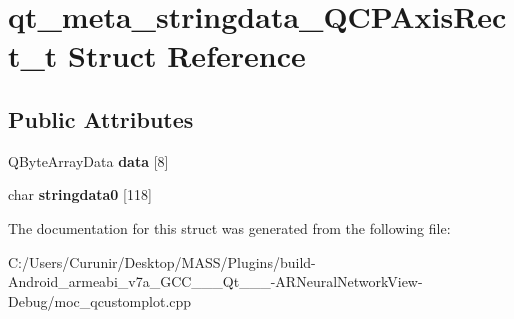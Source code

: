 \hypertarget{structqt__meta__stringdata___q_c_p_axis_rect__t}{}\section{qt\+\_\+meta\+\_\+stringdata\+\_\+\+Q\+C\+P\+Axis\+Rect\+\_\+t Struct Reference}
\label{structqt__meta__stringdata___q_c_p_axis_rect__t}
\subsection*{Public Attributes}
\begin{DoxyCompactItemize}
\item 
\mbox{\label{structqt__meta__stringdata___q_c_p_axis_rect__t_a207ddf267f2f3e418d4af0ecfcf9c18e}} 
Q\+Byte\+Array\+Data {\bfseries data} \mbox{[}8\mbox{]}
\item 
\mbox{\label{structqt__meta__stringdata___q_c_p_axis_rect__t_a8d0981b13dc8514d9966d982b7bc242e}} 
char {\bfseries stringdata0} \mbox{[}118\mbox{]}
\end{DoxyCompactItemize}


The documentation for this struct was generated from the following file\+:\begin{DoxyCompactItemize}
\item 
C\+:/\+Users/\+Curunir/\+Desktop/\+M\+A\+S\+S/\+Plugins/build-\/\+Android\+\_\+armeabi\+\_\+v7a\+\_\+\+G\+C\+C\+\_\+\_\+\_\+\+Qt\+\_\+\_\+\_-\/\+A\+R\+Neural\+Network\+View-\/\+Debug/moc\+\_\+qcustomplot.\+cpp\end{DoxyCompactItemize}
